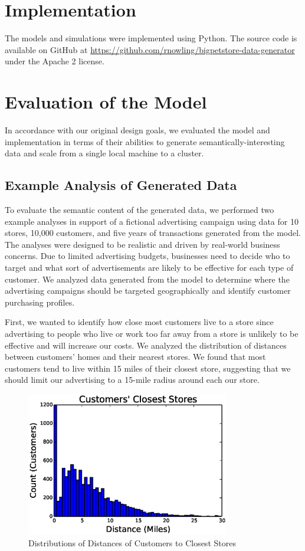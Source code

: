 \documentclass[conference]{IEEEtran}
\begin{document}
\section{Implementation}
The models and simulations were implemented using Python. The source code is available on GitHub \cite{GitHub} at \url{https://github.com/rnowling/bigpetstore-data-generator} under the Apache 2 license.

\section{Evaluation of the Model}
In accordance with our original design goals, we evaluated the model and implementation in terms of their abilities to generate semantically-interesting data and scale from a single local machine to a cluster.

\subsection{Example Analysis of Generated Data}
To evaluate the semantic content of the generated data, we performed two example analyses in support of a fictional advertising campaign using data for 10 stores, 10,000 customers, and five years of transactions generated from the model. The analyses were designed to be realistic and driven by real-world business concerns.  Due to limited advertising budgets, businesses need to decide who to target and what sort of advertisements are likely to be effective for each type of customer.  We analyzed data generated from the model to determine where the advertising campaigns should be targeted geographically and identify customer purchasing profiles.

First, we wanted to identify how close most customers live to a store since advertising to people who live or work too far away from a store is unlikely to be effective and will increase our costs. We analyzed the distribution of distances between customers' homes and their nearest stores.  We found that most customers tend to live within 15 miles of their closest store, suggesting that we should limit our advertising to a 15-mile radius around each our store.

\begin{figure}[!t]
  \centering
  \includegraphics[width=3.5in]{figures/customer_store_distances.eps}
  \caption{Distributions of Distances of Customers to Closest Stores}
  \label{fig:cluster_analysis}
\end{figure}
\end{document}
